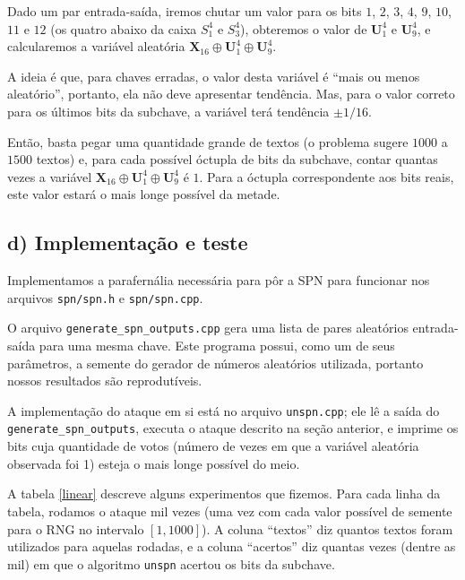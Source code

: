 \documentclass{article}
\newcommand{\xor}{\oplus}
\newcommand{\X}{\textbf{X}}
\newcommand{\U}{\textbf{U}}
\begin{document}
Dado um par entrada-saída,
iremos chutar um valor para os bits $1$, $2$, $3$, $4$, $9$, $10$, $11$ e $12$
(os quatro abaixo da caixa $S_1^4$ e $S_3^4$),
obteremos o valor de $\U_1^4$ e $\U_9^4$,
e calcularemos a variável aleatória $\X_{16} \xor \U_1^4 \xor \U_9^4$.

A ideia é que, para chaves erradas,
o valor desta variável é ``mais ou menos aleatório'',
portanto, ela não deve apresentar tendência.
Mas, para o valor correto para os últimos bits da subchave,
a variável terá tendência $\pm 1/16$.

Então, basta pegar uma quantidade grande de textos
(o problema sugere $1000$ a $1500$ textos)
e, para cada possível óctupla de bits da subchave,
contar quantas vezes a variável $\X_{16} \xor \U_1^4 \xor \U_9^4$ é $1$.
Para a óctupla correspondente aos bits reais,
este valor estará o mais longe possível da metade.

\subsection{d) Implementação e teste}

Implementamos a parafernália necessária para pôr a SPN para funcionar
nos arquivos \verb"spn/spn.h" e \verb"spn/spn.cpp".

O arquivo \verb"generate_spn_outputs.cpp" gera uma lista de pares aleatórios
entrada-saída para uma mesma chave.
Este programa possui, como um de seus parâmetros,
a semente do gerador de números aleatórios utilizada,
portanto nossos resultados são reprodutíveis.

A implementação do ataque em si está no arquivo \verb"unspn.cpp";
ele lê a saída do \verb"generate_spn_outputs",
executa o ataque descrito na seção anterior,
e imprime os bits cuja quantidade de votos
(número de vezes em que a variável aleatória observada foi 1)
esteja o mais longe possível do meio.

A tabela \ref{linear} descreve alguns experimentos que fizemos.
Para cada linha da tabela, rodamos o ataque mil vezes
(uma vez com cada valor possível de semente para o RNG no intervalo $[1, 1000]$).
A coluna ``textos'' diz quantos textos foram utilizados para aquelas rodadas,
e a coluna ``acertos'' diz quantas vezes (dentre as mil)
em que o algoritmo \verb"unspn" acertou os bits da subchave.
\end{document}
